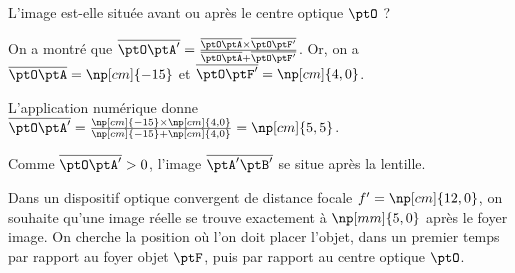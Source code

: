 


\begin{enonce}
L'image est-elle située avant ou après le centre optique $\ptO$ ?
\end{enonce}


\begin{corrige}
On a montré que $\overline{\ptO\ptA'}=\frac{\overline{\ptO\ptA}\times\overline{\ptO\ptF'}}{\overline{\ptO\ptA}+\overline{\ptO\ptF'}}$. Or, on a $\overline{\ptO\ptA}=\np[cm]{-15}$ et $\overline{\ptO\ptF'}=\np[cm]{4,0}$. 

L'application numérique  donne  $\overline{\ptO\ptA'}=\frac{\np[cm]{-15}\times\np[cm]{4,0}}{\np[cm]{-15}+\np[cm]{4,0}}=\np[cm]{5,5}$. 

Comme $\overline{\ptO\ptA'} >0$, l'image $\overline{\ptA'\ptB'}$ se situe après la lentille. 
\end{corrige}


\finEntrainement









\hauteurLargeurCadreReponse		{8mm}{5cm}
\initialisationEntrainement

Dans un dispositif optique convergent de distance focale $f'=\np[cm]{12,0}$, on souhaite qu'une image réelle se trouve exactement à $\np[mm]{5,0}$ après le foyer image. On cherche la position où l'on doit placer l'objet, dans un premier temps par rapport au foyer objet $\ptF$, puis par rapport au centre optique $\ptO$.

